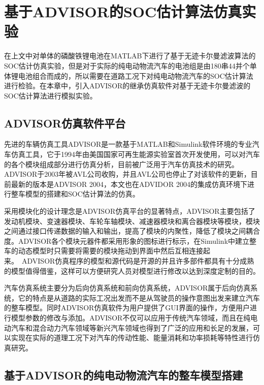 
\chapter{基于ADVISOR的SOC估计算法仿真实验}
在上文中对单体的磷酸铁锂电池在MATLAB下进行了基于无迹卡尔曼滤波算法的SOC估计仿真实验，但是对于实际的纯电动物流汽车的电池组是由180串44并个单体锂电池组合而成的，所以需要在道路工况下对纯电动物流汽车的SOC估计算法进行检验。在本章中，引入ADVISOR的继承仿真软件对基于无迹卡尔曼滤波的SOC估计算法进行模拟实验。
\section{ADVISOR仿真软件平台}
先进的车辆仿真工具ADVISOR是一款基于MATLAB和Simulink软件环境的专业汽车仿真工具，它于1994年由美国国家可再生能源实验室首次开发使用，可以对汽车的各个模块组成部分进行仿真分析，目前被广泛用于汽车仿真技术的研究。ADVISOR于2003年被AVL公司收购，并且AVL公司也停止了对该软件的更新，目前最新的版本是ADVISOR 2004，本文也在ADVIDOR 2004的集成仿真环境下进行整车模型的搭建和SOC估计算法的仿真。

采用模块化的设计理念是ADVISOR仿真平台的显著特点，ADVISOR主要包括了发动机模块、变速器模块、车轮车轴模块、减速器模块和离合器模块等模块，模块之间通过接口传递数据的输入和输出，提高了模块的内聚性，降低了模块之间耦合度。ADVISOR各个模块元器件都采用形象的图标进行标示，在Simulink中建立整车的动态模型时只需要将需要的模块拖动到界面中然后互相连接起来。\ ADVISOR仿真程序的模型和源代码是开源的并且许多部件都具有十分成熟的模型值得借鉴，这样可以方便研究人员对模型进行修改以达到深度定制的目的。

汽车仿真系统主要分为后向仿真系统和前向仿真系统，ADVISOR属于后向仿真系统，它的特点是从道路的实际工况出发而不是从驾驶员的操作意图出发来建立汽车的整车模型。同时ADVISOR仿真软件为用户提供了GUI界面的操作，方便用户进行模型参数的修改与添加。ADVISOR不仅可以应用于传统汽车领域，而且在纯电动汽车和混合动力汽车领域等新兴汽车领域也得到了广泛的应用和长足的发展，可以实现在实际的道理工况下对汽车的传动性能、能量消耗和功率损耗等特性进行仿真研究。
\section{基于ADVISOR的纯电动物流汽车的整车模型搭建}
